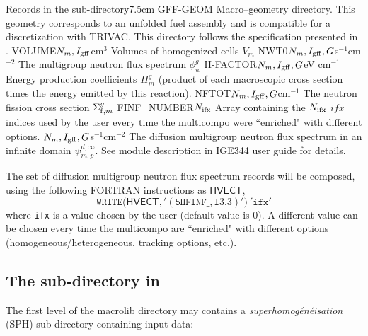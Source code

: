 \begin{DescriptionEnregistrement}{Records in the  sub-directory}{7.5cm}
\DirEnr
  {GFF-GEOM}
  {Macro--geometry directory. This geometry corresponds to an unfolded fuel assembly and is compatible
  for a discretization with TRIVAC. This directory follows the specification presented in .}
\RealEnr
  {VOLUME}{$N_{m},I_{\rm gff}$}{cm$^{3}$}
  {Volumes of homogenized cells $V_{m}$}
\RealEnr
  {NWT0}{$N_{m},I_{\rm gff},G$}{s$^{-1}$cm$^{-2}$}
  {The multigroup neutron flux spectrum $\phi_{w}^{g}$} 
\RealEnr
  {H-FACTOR}{$N_{m},I_{\rm gff},G$}{eV cm$^{-1}$}  
  {Energy production coefficients $H_{m}^{g}$ (product of each macroscopic cross section
  times the energy emitted by this reaction).}
\RealEnr
  {NFTOT}{$N_{m},I_{\rm gff},G$}{cm$^{-1}$}
  {The neutron fission cross section $\Sigma_{{\rm f},m}^{g}$}
\IntEnr
  {FINF\_NUMBER}{$N_{\rm ifx}$}
  {Array containing the $N_{\rm ifx}$ $ifx$ indices used by the user every time the multicompo were ``enriched"
  with different options.}
\RealEnr
  {}{$N_{m},I_{\rm gff},G$}{s$^{-1}$cm$^{-2}$} 
  {The diffusion multigroup neutron flux spectrum in an infinite domain $\psi_{m,p}^{d,\infty}$. See
   module description in IGE344 user guide for details.}
\end{DescriptionEnregistrement}

The set of diffusion multigroup neutron flux spectrum records  will be
composed, using the following FORTRAN instructions as $\mathsf{HVECT}$,
  \begin{displaymath}
    \mathtt{WRITE(}\mathsf{HVECT}\mathtt{,'(5HFINF\_,I3.3)')} \ \mathtt{'ifx'}
  \end{displaymath}
where {\tt ifx} is a value chosen by the user (default value is 0). A different value can be chosen every time the multicompo
are ``enriched" with different options (homogeneous/heterogeneous, tracking options, etc.).

\clearpage

\subsection{The  sub-directory in }\label{sect:macroSPH}

The first level of the macrolib directory may contains a {\sl superhomog\'en\'eisation} (SPH) sub-directory 
containing input data:

